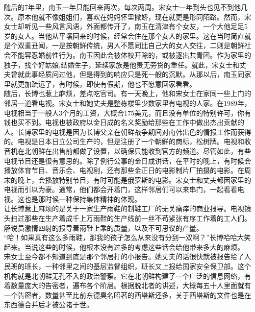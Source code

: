 随后的7年里，南玉一年只能回来两次，每次两周。宋女士一年到头也见不到他几次。原本他就不像姐姐们，喜欢在妈妈怀里撒娇，现在就更是形同陌路。然而，宋女士却听见一些风言风语，外面都传开了，南玉在清津有个女友，一个大他足足5岁的女人。当他从平壤回来的时候，经常会住在那个女人的家里。这在当时简直就是个双重丑闻，一是按朝鲜传统，男人不愿同比自己大的女人交往，二则是朝鲜社会不能容忍婚前性行为。南玉因此会被体校开除的，或被逐出共青团。作为家里的独子，找个好姑娘,结婚生子，延续家族是他责无旁贷的重任。就此，宋女士和丈夫曾就此事经质问过他，但是得到的响应只是死一般的沉默。从那以后，南玉同家里就更加疏远了，有时候，即使有假期，他也不愿意回家看看。\\

随后，长博也惹上麻烦，差点吃官司。有一天晚上，他和宋女士在家同一些上门的邻居一道看电视。宋女士和她丈夫是整栋楼里少数家里有电视的人家。在1989年，电视相当于一般人3个月的工资，大概合175美元，而且没有单位的特别许可，你有钱也买不到。电视也被政府以金日成的名义奖励给那些在工作中做出杰出贡献的人。长博家里的电视是因为长博父亲在朝鲜战争期间对南韩出色的情报工作而获得的。电视是日本日立公司生产的，但是注册了一个朝鲜的商标，松树牌。电视和收音机在北朝鲜在出售前都做了设置，以确保只能收到官方的频道。尽管如此，有些电视节目还是很有意思的。除了例行公事的金日成讲话，在平时的晚上，有时候会播放体育节目、音乐会、电视剧，还有那些金正日的电影制片厂拍摄的电影。在周末的晚上，会播放特别节目，有时可能是俄罗斯的电影。宋女士和丈夫都因家里的电视而引以为豪。通常，他们都会开着门，这样邻居们可以来串门，一起看看电视。这也是那时候一种保持集体精神的体现。\\

让长博惹上麻烦的是关于一家生产雨鞋的制鞋工厂的无关痛痒的商业报导。电视镜头扫过那些在生产着成千上万雨鞋的生产线前一丝不苟紧张有序工作着的工人们。解说员激情四射的报导着雨鞋上乘的质量，以及不可思议的产量。\\

“哈！如果真有这么多雨鞋，那我的孩子怎么从来没有分到一双啊？”长博哈哈大笑起来。当说这些的时候，他根本没有过多的考虑这些话会给他带来多大的麻烦。\\

宋女士至今都不知道到底是那个邻居打的小报告。她丈夫的话很快就被报告给了人民班的班长，一种邻里之间的基层监督组织，班长又上报给国家安全保卫部。这个机构就是北朝鲜无孔不入的政治警察。它在北朝鲜构建了一个广泛的信息网络，有着数量庞大的告密者，遍布各个阶层。根据脱北者的讲述，大概每五十人里面就有一个告密者，数量甚至比前东德臭名昭著的西塔斯还多，关于西塔斯的文件也是在东西德合并后才被公诸于世。\\

